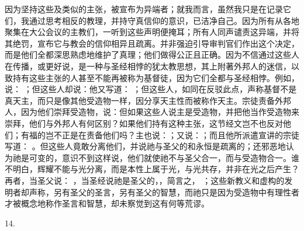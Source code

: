 因为坚持这些及类似的主张，被宣布为异端者；就我而言，虽然我只是在记录它们，我通过思考相反的教理，并持守真信仰的意识，已洁净自己。因为所有从各地聚集在大公会议的主教们，一听到这些声明便掩耳；所有人同声谴责这异端，并将其绝罚，宣布它与教会的信仰相异且疏离。并非强迫引导审判官们作出这个决定，而是他们全都深思熟虑地维护了真理；他们做得公正且正确。因为不信通过这些人在传播，或更好说，是一种与圣经相悖的犹太教思想，其上附著外邦人的迷信，以致持有这些主张的人甚至不能再被称为基督徒，因为它们全都与圣经相悖。例如，说： ；但这些人却说：他又写道： ；但这些人，如同在反驳此点，声称基督不是真天主，而只是像其他受造物一样，因分享天主性而被称作天主。宗徒责备外邦人，因为他们崇拜受造物，说：但如果这些人说主是受造物，并把他当作受造物来崇拜，他们与外邦人有何区别？如果他们持有这种主张，这节经文岂不也反对他们；有福的岂不正是在责备他们吗？主也说：；又说：；而且他所派遣宣讲的宗徒写道： 。但这些人竟敢分离他们，并说祂与圣父的和永恒是疏离的；还邪恶地认为祂是可变的，意识不到这样说，他们就使祂不与圣父合一，而与受造物合一。谁不明白，辉耀不能与光分离，而是本性上属于光，与光共存，并非在光之后产生？再者，当圣父说： ，当圣经说祂是圣父的，，简言之， ；这些新教义和虚构的发明者却声称，另有圣父的圣言，另有圣父的智慧，而祂只是因为受造物中有理性者才被概念地称作圣言和智慧，却未察觉到这有何等荒谬。\par

14. \par

